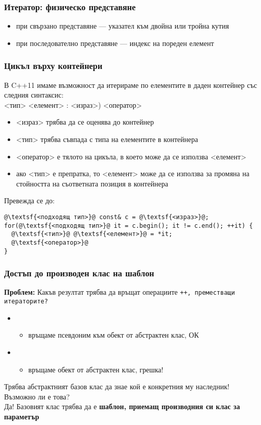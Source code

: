 \documentclass[alsotrans]{beamerswitch}
\def\crtp{article}
\begin{document}
\begin{frame}
  \frametitle{Итератор: физическо представяне}

  \begin{itemize}
  \item при свързано представяне --- указател към двойна или тройна кутия
  \item при последователно представяне --- индекс на пореден елемент
  \end{itemize}
\end{frame}

\begin{frame}[fragile]
  \frametitle{Цикъл върху контейнери}
  В C++11 имаме възможност да итерираме по елементите в даден контейнер със следния синтаксис:\\
  <тип> <елемент> \tta: <израз>\tta) <оператор>
  \pause
  \begin{itemize}[<+->]
  \item{} <израз> трябва да се оценява до контейнер
  \item{} <тип> трябва съвпада с типа на елементите в контейнера
  \item{} <оператор> е тялото на цикъла, в което може да се използва <елемент>
  \item ако <тип> е препратка, то <елемент> може да се използва за промяна на стойността на съответната позиция в контейнера
  \end{itemize}
  \onslide<+->
  Превежда се до:
\vspace{-.5ex}
\begin{lstlisting}
@\textsf{<подходящ тип>}@ const& c = @\textsf{<израз>}@;
for(@\textsf{<подходящ тип>}@ it = c.begin(); it != c.end(); ++it) {
  @\textsf{<тип>}@ @\textsf{<елемент>}@ = *it;
  @\textsf{<оператор>}@
}
\end{lstlisting}
\end{frame}

\mode<\crtp>
\begin{frame}
  \frametitle{Достъп до производен клас на шаблон}

  \textbf{Проблем:} Какъв резултат трябва да връщат операциите \tt{++}, преместващи итераторите?\\[2ex]
  \begin{itemize}
  \item {}
    \begin{itemize}
    \item връщаме псевдоним към обект от абстрактен клас, ОК
    \end{itemize}
  \item{}
    \begin{itemize}
    \item връщаме обект от абстрактен клас, \alert{грешка!}
    \end{itemize}
  \end{itemize}
  \vspace{2ex}
  \pause
  Трябва абстрактният базов клас да знае кой е конкретния му наследник! Възможно ли е това?\\[2ex]
  \pause
  \alert{Да! Базовият клас трябва да е \textbf{шаблон, приемащ производния си клас за параметър}}
\end{frame}
\end{document}
